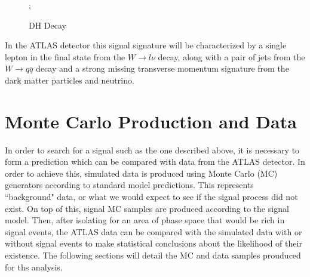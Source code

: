 \begin{figure}[H]
    \centering
    ;
    \caption{DH Decay}
    \label{fig:dh_feynman}
\end{figure}

In the ATLAS detector this signal signature will be characterized by a single lepton in the final state from the $ W \rightarrow l\nu $ decay, along with a pair of jets from the $ W \rightarrow q\bar{q} $ decay and a strong missing transverse momentum signature from the dark matter particles and neutrino.

\section{Monte Carlo Production and Data}
\label{section:mc_prod}
In order to search for a signal such as the one described above, it is necessary to form a prediction which can be compared with data from the ATLAS detector. In order to achieve this, simulated data is produced using Monte Carlo (MC) generators according to standard model predictions. This represents ``background" data, or what we would expect to see if the signal process did not exist. On top of this, signal MC samples are produced according to the signal model. Then, after isolating for an area of phase space that would be rich in signal events, the ATLAS data can be compared with the simulated data with or without signal events to make statistical conclusions about the likelihood of their existence. The following sections will detail the MC and data samples prouduced for ths analysis.

